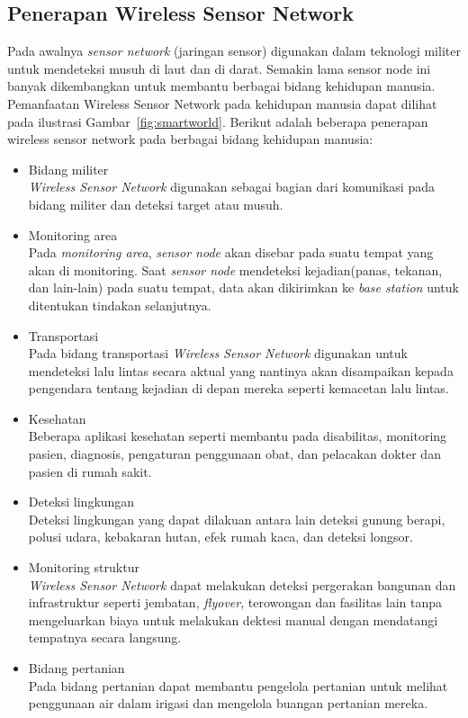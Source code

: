 \subsection{Penerapan Wireless Sensor Network}
Pada awalnya \textit{sensor network} (jaringan sensor) digunakan dalam teknologi militer untuk mendeteksi musuh di laut dan di darat. Semakin lama sensor node ini banyak dikembangkan untuk membantu berbagai bidang kehidupan manusia. Pemanfaatan Wireless Sensor Network pada kehidupan manusia dapat dilihat pada ilustrasi Gambar~\ref{fig:smartworld}. Berikut adalah beberapa penerapan wireless sensor network pada berbagai bidang kehidupan manusia:
\begin{itemize}
\item Bidang militer\\
\textit{Wireless Sensor Network} digunakan sebagai bagian dari komunikasi pada bidang militer dan deteksi target atau musuh.

\item Monitoring area\\
Pada \textit{monitoring area}, \textit{sensor node} akan disebar pada suatu tempat yang akan di monitoring. Saat \textit{sensor node} mendeteksi kejadian(panas, tekanan, dan lain-lain) pada suatu tempat, data akan dikirimkan ke \textit{base station} untuk ditentukan tindakan selanjutnya.

\item Transportasi\\
Pada bidang transportasi \textit{Wireless Sensor Network} digunakan untuk mendeteksi lalu lintas secara aktual yang nantinya akan disampaikan kepada pengendara tentang kejadian di depan mereka seperti kemacetan lalu lintas. 

\item Kesehatan\\
Beberapa aplikasi kesehatan seperti membantu pada disabilitas, monitoring pasien, diagnosis, pengaturan penggunaan obat, dan pelacakan dokter dan pasien di rumah sakit.

\item Deteksi lingkungan\\
Deteksi lingkungan yang dapat dilakuan antara lain deteksi gunung berapi, polusi udara, kebakaran hutan, efek rumah kaca, dan deteksi longsor.

\item Monitoring struktur\\
\textit{Wireless Sensor Network} dapat melakukan deteksi pergerakan bangunan dan infrastruktur seperti jembatan, \textit{flyover}, terowongan dan fasilitas lain tanpa mengeluarkan biaya untuk melakukan dektesi manual dengan mendatangi tempatnya secara langsung.

\item Bidang pertanian\\
Pada bidang pertanian dapat membantu pengelola pertanian untuk melihat penggunaan air dalam irigasi dan mengelola buangan pertanian mereka.
\end{itemize}

